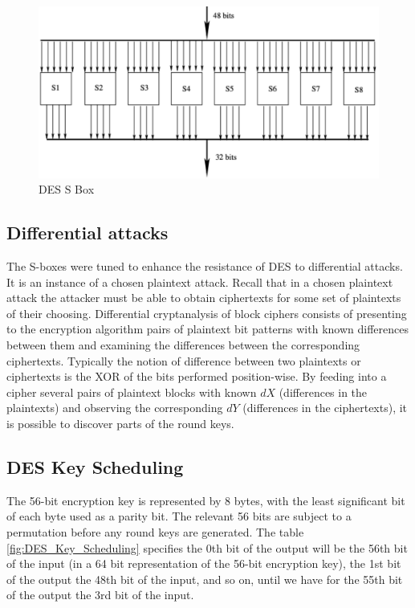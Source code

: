 \begin{figure}
	\centering
	\includegraphics[width=0.7\linewidth]{Images/Chapter3/DES_SubstitutionStep}
	\caption{DES S Box}
	\label{fig:DES_SubstitutionStep}
\end{figure}
\subsection{Differential attacks}

The S-boxes were tuned to enhance the resistance of DES to differential attacks. It is an instance of a chosen plaintext attack. Recall that in a chosen plaintext attack the attacker must be able to obtain ciphertexts for some set of plaintexts of their choosing.
Differential cryptanalysis of block ciphers consists of presenting to the encryption algorithm pairs of plaintext bit patterns with known differences between them and examining the differences between the corresponding ciphertexts. Typically the notion of difference between two plaintexts or ciphertexts is the XOR of the bits performed position-wise.
By feeding into a cipher several pairs of plaintext blocks with known $dX$ (differences in the plaintexts) and observing the corresponding $dY$ (differences in the ciphertexts), it is possible to discover parts of the round keys.


\subsection{DES Key Scheduling}

The 56-bit encryption key is represented by 8 bytes, with the least significant bit of each byte used as a parity bit. The relevant 56 bits are subject to a permutation before any round keys are generated. The table \ref{fig:DES_Key_Scheduling} specifies the 0th bit of the output will be the 56th bit of the input (in a 64 bit representation of the 56-bit encryption key), the 1st bit of the output the 48th bit of the input, and so on, until we have for the 55th bit of the output the 3rd bit of the input.

